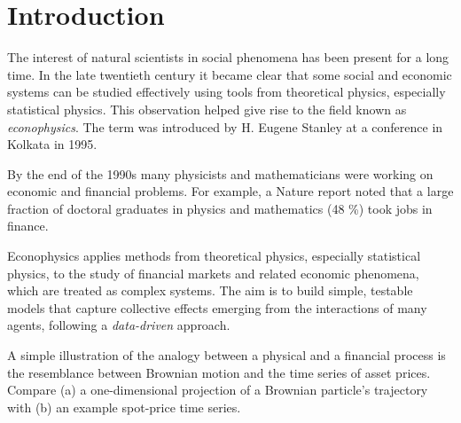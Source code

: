 \chapter{Introduction}

The interest of natural scientists in social phenomena has been present for a long time. In the late twentieth century it became clear that some social and economic systems can be studied effectively using tools from theoretical physics, especially statistical physics. This observation helped give rise to the field known as \emph{econophysics}. The term was introduced by H. Eugene Stanley at a conference in Kolkata in 1995.

By the end of the 1990s many physicists and mathematicians were working on economic and financial problems. For example, a Nature report noted that a large fraction of doctoral graduates in physics and mathematics (48 \%) took jobs in finance.\cite{gershon1998bank}

Econophysics applies methods from theoretical physics, especially statistical physics, to the study of financial markets and related economic phenomena, which are treated as complex systems. The aim is to build simple, testable models that capture collective effects emerging from the interactions of many agents, following a \textit{data-driven} approach.

A simple illustration of the analogy between a physical and a financial process is the resemblance between Brownian motion and the time series of asset prices. Compare (a) a one-dimensional projection of a Brownian particle's trajectory with (b) an example spot-price time series.

